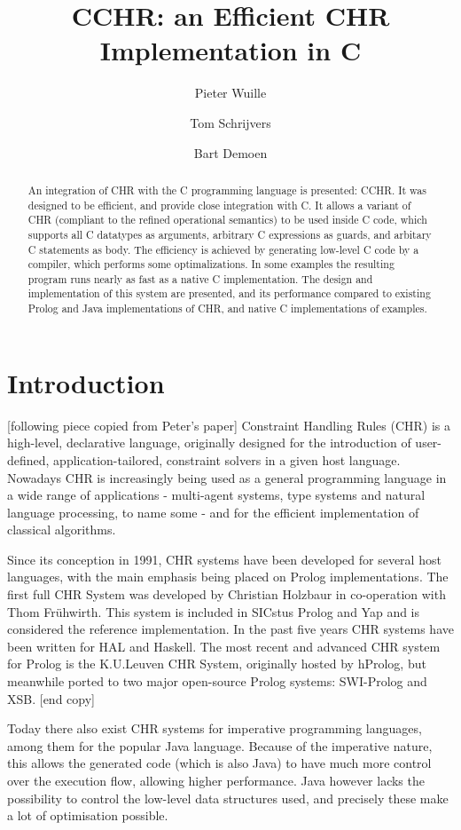 \documentclass{llncs}
\title{CCHR: an Efficient CHR Implementation in C}
\author{Pieter Wuille \and Tom Schrijvers \and Bart Demoen}
\institute{Department of Computer Science, K.U.Leuven, Belgium}
\begin{document}
\maketitle

\begin{abstract}
An integration of CHR with the C programming language is presented: CCHR.
It was designed to be efficient, and provide close integration with C.
It allows a variant of CHR (compliant to the refined operational semantics)
to be used inside C code, which supports all C datatypes as arguments, arbitrary
C expressions as guards, and arbitary C statements as body.
The efficiency is achieved by generating low-level C code by a compiler, 
which performs some optimalizations. In some examples the resulting program
runs nearly as fast as a native C implementation.
The design and implementation of this system are presented, and its performance
compared to existing Prolog and Java implementations of CHR, and native C
implementations of examples.
\end{abstract}

\section{Introduction}

[following piece copied from Peter's paper] Constraint Handling Rules (CHR) is a
high-level, declarative language, originally designed for the introduction of
user-defined, application-tailored, constraint solvers in a given host language.
Nowadays CHR is increasingly being used as a general programming language in a
wide range of applications - multi-agent systems, type systems and natural
language processing, to name some - and for the efficient implementation of
classical algorithms.

Since its conception in 1991, CHR systems have been developed for several host
languages, with the main emphasis being placed on Prolog implementations.
The first full CHR System was developed by Christian Holzbaur in co-operation
with Thom Fr\"uhwirth. This system is included in SICstus Prolog and Yap and is
considered the reference implementation. In the past five years CHR systems have
been written for HAL and Haskell. The most recent and advanced CHR system for
Prolog is the K.U.Leuven CHR System, originally hosted by hProlog, but
meanwhile ported to two major open-source Prolog systems: SWI-Prolog and XSB.
[end copy]

Today there also exist CHR systems for imperative programming
languages, among them for the popular Java language. Because of the imperative
nature, this allows the generated code (which is also Java) to have much more
control over the execution flow, allowing higher performance. Java however lacks
the possibility to control the low-level data structures used, and precisely these
make a lot of optimisation possible.
\end{document}
